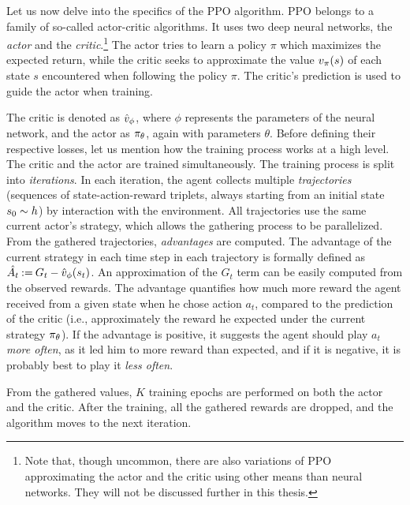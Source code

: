 Let us now delve into the specifics of the PPO algorithm.
PPO belongs to a family of so-called actor-critic algorithms.
It uses two deep neural networks, the \emph{actor} and the \emph{critic}.\footnote{Note that, though uncommon, there are also variations of PPO approximating the actor and the critic using other means than neural networks.
They will not be discussed further in this thesis.}
The actor tries to learn a policy $ \pi $ which maximizes the expected return,
while the critic seeks to approximate the value $ v_{\pi}\!\left(s\right) $ of each state $ s $ encountered when following the policy $\pi$.
The critic's prediction is used to guide the actor when training.

The critic is denoted as $ \hat{v}_{\phi} $, where $ \phi $ represents the parameters of the neural network, and the actor as $ \pi_{\theta} $, again with parameters $ \theta $.
Before defining their respective losses, let us mention how the training process works at a high level.
The critic and the actor are trained simultaneously.
The training process is split into \emph{iterations}.
In each iteration, the agent collects multiple \emph{trajectories} (sequences of state-action-reward triplets, always starting from an initial state $ s_0 \sim h $) by interaction with the environment.
All trajectories use the same current actor's strategy, which allows the gathering process to be parallelized.
From the gathered trajectories, \emph{advantages} are computed.
The advantage of the current strategy in each time step in each trajectory is formally defined as $ \hat {A_t} \mathbin{:=} G_t - \hat{v}_{\phi}\!\left(s_t\right) $.
An approximation of the $ G_t $ term can be easily computed from the observed rewards.
The advantage quantifies how much more reward the agent received from a given state when he chose action $ a_t $, compared to the prediction of the critic (i.e., approximately the reward he expected under the current strategy $ \pi_{\theta} $).
If the advantage is positive, it suggests the agent should play $ a_t $ \emph{more often}, as it led him to more reward than expected, and if it is negative, it is probably best to play it \emph{less often}.

From the gathered values, $ K $ training epochs are performed on both the actor and the critic.
After the training, all the gathered rewards are dropped, and the algorithm moves to the next iteration.

